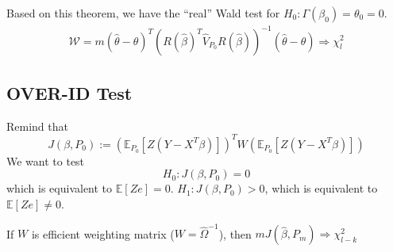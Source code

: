 \documentclass[11pt]{elegantbook}
\begin{document}
Based on this theorem, we have the ``real'' Wald test for $H_0:\Gamma(\beta_0)=\theta_0=0$.
\begin{equation}
    \begin{aligned}
        \mathcal{W}=m(\hat{\theta}-\theta)^T\left(R(\hat{\beta})^T\hat{V}_{P_0}R(\hat{\beta})\right)^{-1}(\hat{\theta}-\theta) \Rightarrow \chi^2_l
    \end{aligned}
    \nonumber
\end{equation}


\subsection{OVER-ID Test}
Remind that $$J(\beta,P_0):=\left(\mathbb{E}_{P_0}[Z(Y-X^T\beta)]\right)^TW\left(\mathbb{E}_{P_0}[Z(Y-X^T\beta)]\right)$$
We want to test
$$H_0: J(\beta,P_0)=0$$
which is equivalent to $\mathbb{E}[Ze]=0$. $H_1: J(\beta,P_0)> 0$, which is equivalent to $\mathbb{E}[Ze]\neq 0$.
\begin{theorem}
    If $W$ is efficient weighting matrix ($W=\hat{\Omega}^{-1}$), then $m J(\hat{\beta},P_m) \Rightarrow \chi^2_{l-k}$
\end{theorem}
\end{document}
